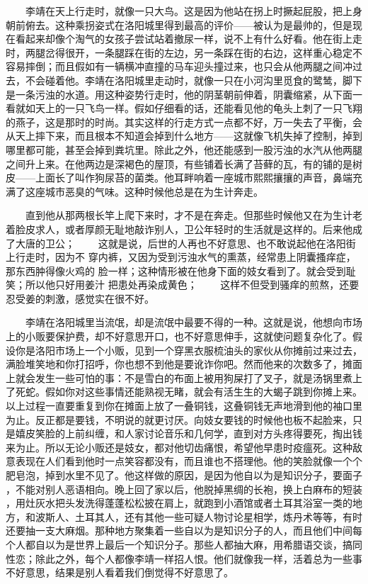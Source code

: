 　　李靖在天上行走时，就像一只大鸟。这是因为他站在拐上时撅起屁股，把上身 朝前俯去。这种乘拐姿式在洛阳城里得到最高的评价——被认为是最帅的，但是现 在看起来却像个淘气的女孩子尝试站着撤尿一样，说不上有什么好看。他在街上走 时，两腿岔得很开，一条腿踩在街的左边，另一条踩在街的右边，这样重心稳定不 容易摔倒；而且假如有一辆横冲直撞的马车迎头撞过来，也只会从他两腿之间冲过 去，不会碰着他。李靖在洛阳城里走动时，就像一只在小河沟里觅食的鹭鸶，脚下 是一条污浊的水道。用这种姿势行走时，他的阴茎朝前伸着，阴囊缩紧，从下面一 看就如天上的一只飞鸟一样。假如仔细看的话，还能看见他的龟头上刺了一只飞翔 的燕子，这是那时的时尚。其实这样的行走方式一点都不好，万一失去了平衡，会 从天上摔下来，而且根本不知道会掉到什么地方——这就像飞机失掉了控制，掉到 哪里都可能，甚至会掉到粪坑里。除此之外，他还能感到一股污浊的水汽从他两腿 之间升上来。在他两边是深褐色的屋顶，有些铺着长满了苔藓的瓦，有的铺的是树 皮——上面长了叫作狗尿苔的菌类。他耳畔响着一座城市熙熙攘攘的声音，鼻端充 满了这座城市恶臭的气味。这种时候他总是在为生计奔走。 

　　直到他从那两根长竿上爬下来时，才不是在奔走。但那些时候他又在为生计老 着脸皮求人，或者厚颜无耻地敲诈别人，卫公年轻时的生活就是这样的。后来他成 了大唐的卫公； 　　这就是说，后世的人再也不好意思、也不敢说起他在洛阳街上行走时，因为不 穿内裤，又因为受到污浊水气的熏蒸，经常患上阴囊搔痒症，那东西肿得像火鸡的 脸一样；这种情形被在他身下面的妓女看到了。就会受到耻笑；所以他只好用姜汁 把患处再染成黄色； 　　这样不但受到骚痒的煎熬，还要忍受姜的刺激，感觉实在很不好。 

　　李靖在洛阳城里当流氓，却是流氓中最要不得的一种。这就是说，他想向市场 上的小贩要保护费，却不好意思开口，也不好意思伸手，这就使问题复杂化了。假 设你是洛阳市场上一个小贩，见到一个穿黑衣服梳油头的家伙从你摊前过来过去， 满脸堆笑地和你打招呼，你也想不到他是要讹诈你吧。然而他来的次数多了，摊面 上就会发生一些可怕的事：不是雪白的布面上被用狗屎打了叉子，就是汤锅里煮上 了死蛇。假如你对这些事情还能熟视无睹，就会有活生生的大蝎子跳到你摊上来。 以上过程一直要重复到你在摊面上放了一叠铜钱，这叠铜钱无声地滑到他的袖口里 为止。反正都是要钱，不明说的就更讨厌。向妓女要钱的时候他也板不起脸来，只 是嬉皮笑脸的上前纠缠，和人家讨论音乐和几何学，直到对方头疼得要死，掏出钱 来为止。所以无论小贩还是妓女，都对他切齿痛恨，希望他早患时疫瘟死。这种敌 意表现在人们看到他时一点笑容都没有，而且谁也不搭理他。他的笑脸就像一个个 肥皂泡，掉到水里不见了。他这样做的原因，是因为他自以为是知识分子，要面子 ，不能对别人恶语相向。晚上回了家以后，他脱掉黑绸的长袍，换上白麻布的短装 ，用灶灰水把头发洗得蓬蓬松松披在肩上，就跑到小酒馆或者土耳其浴室一类的地 方，和波斯人、土耳其人，还有其他一些可疑人物讨论星相学，炼丹术等等，有时 还要抽一支大麻烟。那种地方聚集着一些自以为是知识分子的人，而且他们中间每 个人都自以为是世界上最后一个知识分子。那些人都抽大麻，用希腊语交谈，搞同 性恋；除此之外，每个人都像李靖一样招人恨。他们就像我一样，活着总为一些事 不好意思，结果是别人看着我们倒觉得不好意思了。 

